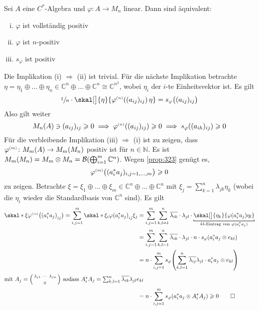 \begin{satz}[label=satz:325]
	Sei $A$ eine $C^*$-Algebra und $\varphi \colon A \to M_n$ linear.
	Dann sind äquivalent:
	\begin{enumerate}[(i)]
		\item $\varphi$ ist vollständig positiv
		\item $\varphi$ ist $n$-positiv
		\item $s_\varphi$ ist positiv
	\end{enumerate}
\end{satz}
\begin{beweis}
	Die Implikation (i) $\Rightarrow $ (ii) ist trivial. Für die nächste Implikation betrachte $\eta = \eta_1 \oplus \ldots \oplus \eta_n \in \mathbb{C}^n \oplus \ldots \oplus \mathbb{C}^n \cong \mathbb{C}^{n^2}$, wobei $\eta_i$ der $i$-te Einheitsvektor ist.
	Es gilt
	\[
		\sfrac{1}{n} \cdot \skal[\big]{\eta}{\varphi^\ssbrace{n} \enbrace*{(a_{ij})_{ij}} \,\eta} = s_\varphi \enbrace[\big]{(a_{ij})_{ij}}
	\]
	Also gilt weiter
	\[
		M_n(A) \ni (a_{ij})_{ij} \ge 0 \implies \varphi^\ssbrace{n} \enbrace*{(a_{ij})_{ij}} \ge 0 \implies s_\varphi \enbrace*{(a_{ih})_{ij}} \ge 0
	\] 
	Für die verbleibende Implikation (iii) $\Rightarrow $ (i) ist zu zeigen, dass $\varphi^\ssbrace{m} \colon M_m(A) \to M_m(M_n)$ positiv ist für $n \in \mathbb{N}$.
	Es ist $M_m(M_n) = M_m \otimes M_n = \mathcal{B} \enbrace*{\bigoplus_{i=1}^m \mathbb{C}^n}$.
	Wegen \autoref{prop:323} genügt es, 
	\[
		\varphi^\ssbrace{m} \enbrace[\big]{(a_i^* a_j)_{i,j=1, \ldots ,m}} \ge 0 
	\]
	zu zeigen.
	Betrachte $\xi = \xi_1 \oplus \ldots \oplus \xi_m \in \mathbb{C}^n \oplus  \ldots \oplus \mathbb{C}^n$ mit $\xi_j = \sum_{k=1}^n \lambda_{jk} \eta_k$ (wobei die $\eta_i$ wieder die Standardbasis von $\mathbb{C}^n$ sind).
	Es gilt
	\begin{align}
		\skal*{\xi}{\varphi^\ssbrace{m} \enbrace[\big]{ \enbrace*{a_i^* a_j}_{ij}}} = \sum_{i,j=1}^{m} \skal*{\xi_i}{\varphi \enbrace*{a_i^* a_j}_{ij} \xi_j} 
		&= \sum_{i,j=1}^{m} \sum_{k,l=1}^{n} \overline{\lambda_{ik}}\cdot \lambda_{jl} \cdot \Underbracket{\skal[\big]{\eta_k}{\varphi(a_i^* a_j) \eta_l}}{\text{$kl$-Eintrag von $\varphi(a_i^*a_j)$}} \\
		&= \sum_{i,j=1}^{m} \sum_{k,l=1}^{n} \overline{\lambda_{ik}} \cdot \lambda_{jl} \cdot n \cdot s_\varphi \enbrace*{a_i^* a_j \otimes e_{kl}} \\
		&= n \cdot \sum_{i,j=1}^{m} s_\varphi \enbrace*{\sum_{k,l=1}^{n} \overline{\lambda_{ij}} \lambda_{jl} \cdot a_i^* a_j \otimes e_{kl}} \\
		\shortintertext{mit $A_j = \begin{psmallmatrix}
			\lambda_{j1} & \cdots & \lambda_{jn} \\
			& & \\
			 & 0 & 
		\end{psmallmatrix}$ sodass $A_i^*A_j = \sum_{k,l=1}^{n} \overline{\lambda_{ik}} \lambda_{jl} e_{kl}$}
		&= n \cdot \sum_{i,j=1}^{m}  s_\varphi \enbrace*{a_i^*a_j \otimes A_i^* A_j} \ge 0 \qedhere
	\end{align}
\end{beweis}

